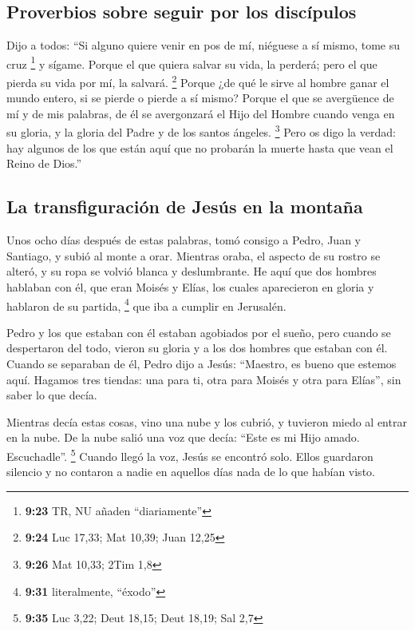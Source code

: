 \begin{paracol}{2}
\hypertarget{proverbios-sobre-seguir-por-los-discuxedpulos}{%
\subsection{Proverbios sobre seguir por los
discípulos}\label{proverbios-sobre-seguir-por-los-discuxedpulos}}

 Dijo a todos: ``Si alguno quiere venir en pos de mí,
niéguese a sí mismo, tome su cruz \footnote{\textbf{9:23} TR, NU añaden
  ``diariamente''} y sígame.  Porque el que quiera salvar
su vida, la perderá; pero el que pierda su vida por mí, la salvará.
\footnote{\textbf{9:24} Luc 17,33; Mat 10,39; Juan 12,25}
 Porque ¿de qué le sirve al hombre ganar el mundo entero,
si se pierde o pierde a sí mismo?  Porque el que se
avergüence de mí y de mis palabras, de él se avergonzará el Hijo del
Hombre cuando venga en su gloria, y la gloria del Padre y de los santos
ángeles. \footnote{\textbf{9:26} Mat 10,33; 2Tim 1,8} 
Pero os digo la verdad: hay algunos de los que están aquí que no
probarán la muerte hasta que vean el Reino de Dios.''

\hypertarget{la-transfiguraciuxf3n-de-jesuxfas-en-la-montauxf1a}{%
\subsection{La transfiguración de Jesús en la
montaña}\label{la-transfiguraciuxf3n-de-jesuxfas-en-la-montauxf1a}}

 Unos ocho días después de estas palabras, tomó consigo a
Pedro, Juan y Santiago, y subió al monte a orar. 
Mientras oraba, el aspecto de su rostro se alteró, y su ropa se volvió
blanca y deslumbrante.  He aquí que dos hombres hablaban
con él, que eran Moisés y Elías,  los cuales aparecieron
en gloria y hablaron de su partida, \footnote{\textbf{9:31}
  literalmente, ``éxodo''} que iba a cumplir en Jerusalén.

 Pedro y los que estaban con él estaban agobiados por el
sueño, pero cuando se despertaron del todo, vieron su gloria y a los dos
hombres que estaban con él.  Cuando se separaban de él,
Pedro dijo a Jesús: ``Maestro, es bueno que estemos aquí. Hagamos tres
tiendas: una para ti, otra para Moisés y otra para Elías'', sin saber lo
que decía.

 Mientras decía estas cosas, vino una nube y los cubrió,
y tuvieron miedo al entrar en la nube.  De la nube salió
una voz que decía: ``Este es mi Hijo amado. Escuchadle''. \footnote{\textbf{9:35}
  Luc 3,22; Deut 18,15; Deut 18,19; Sal 2,7}  Cuando
llegó la voz, Jesús se encontró solo. Ellos guardaron silencio y no
contaron a nadie en aquellos días nada de lo que habían visto.


\end{paracol}
